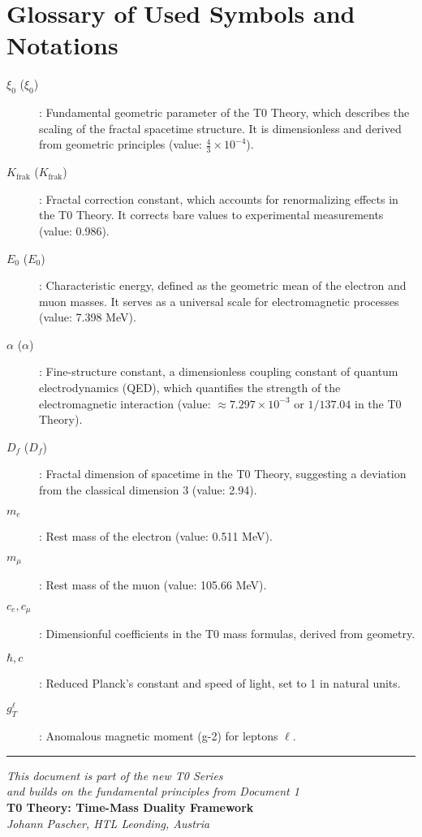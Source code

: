 \documentclass[12pt,a4paper]{article}
\newcommand{\xipar}{\xi_0}
\newcommand{\Kfrak}{K_{\text{frak}}}
\newcommand{\Ezero}{E_0}
\newcommand{\alphaem}{\alpha}
\newcommand{\Dfrak}{D_f}
\begin{document}
	\section{Glossary of Used Symbols and Notations}
	\begin{description}
		\item[$\xipar$ ($\xi_0$)]: Fundamental geometric parameter of the T0 Theory, which describes the scaling of the fractal spacetime structure. It is dimensionless and derived from geometric principles (value: $\frac{4}{3} \times 10^{-4}$).
		\item[$\Kfrak$ ($K_{\text{frak}}$)]: Fractal correction constant, which accounts for renormalizing effects in the T0 Theory. It corrects bare values to experimental measurements (value: 0.986).
		\item[$\Ezero$ ($E_0$)]: Characteristic energy, defined as the geometric mean of the electron and muon masses. It serves as a universal scale for electromagnetic processes (value: 7.398 MeV).
		\item[$\alphaem$ ($\alpha$)]: Fine-structure constant, a dimensionless coupling constant of quantum electrodynamics (QED), which quantifies the strength of the electromagnetic interaction (value: $\approx 7.297 \times 10^{-3}$ or $1/137.04$ in the T0 Theory).
		\item[$\Dfrak$ ($D_f$)]: Fractal dimension of spacetime in the T0 Theory, suggesting a deviation from the classical dimension 3 (value: 2.94).
		\item[$m_e$]: Rest mass of the electron (value: 0.511 MeV).
		\item[$m_\mu$]: Rest mass of the muon (value: 105.66 MeV).
		\item[$c_e, c_\mu$]: Dimensionful coefficients in the T0 mass formulas, derived from geometry.
		\item[$\hbar, c$]: Reduced Planck's constant and speed of light, set to 1 in natural units.
		\item[$g_T^\ell$]: Anomalous magnetic moment (g-2) for leptons $\ell$.
	\end{description}
	
	\begin{center}
		\hrule
		\vspace{0.5cm}
		\textit{This document is part of the new T0 Series}\\
		\textit{and builds on the fundamental principles from Document 1}\\
		\vspace{0.3cm}
		\textbf{T0 Theory: Time-Mass Duality Framework}\\
		\textit{Johann Pascher, HTL Leonding, Austria}\\
	\end{center}
	
	
\end{document}
